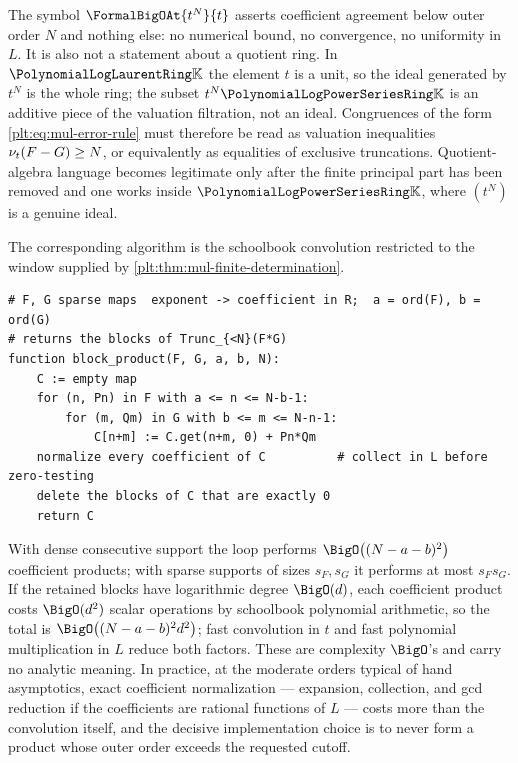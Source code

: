 \begin{remark}
\label{plt:rmk:mul-not-an-ideal}
The symbol $\FormalBigOAt{t^{N}}{t}$ asserts coefficient agreement below
outer order $N$ and nothing else: no numerical bound, no convergence, no
uniformity in $L$.  It is also not a statement about a quotient ring.  In
$\PLlau$ the element $t$ is a unit, so the ideal generated by $t^N$ is the
whole ring; the subset $t^N\PLpow$ is an additive piece of the
valuation filtration, not an ideal.  Congruences of the form
\eqref{plt:eq:mul-error-rule} must therefore be read as valuation
inequalities $\nu_{t}(F-G)\ge N$, or equivalently as equalities of exclusive
truncations.  Quotient-algebra language becomes legitimate only after the
finite principal part has been removed and one works inside $\PLpow$, where
$(t^N)$ is a genuine ideal.
\end{remark}

The corresponding algorithm is the schoolbook convolution restricted to the
window supplied by \cref{plt:thm:mul-finite-determination}.

\begin{lstlisting}[style=pseudo,caption={Truncated block product},label={plt:alg:mul-truncated}]
# F, G sparse maps  exponent -> coefficient in R;  a = ord(F), b = ord(G)
# returns the blocks of Trunc_{<N}(F*G)
function block_product(F, G, a, b, N):
    C := empty map
    for (n, Pn) in F with a <= n <= N-b-1:
        for (m, Qm) in G with b <= m <= N-n-1:
            C[n+m] := C.get(n+m, 0) + Pn*Qm
    normalize every coefficient of C          # collect in L before zero-testing
    delete the blocks of C that are exactly 0
    return C
\end{lstlisting}

\begin{remark}
\label{plt:rmk:mul-cost}
With dense consecutive support the loop performs
$\BigO\bigl((N-a-b)^2\bigr)$ coefficient products; with sparse supports of
sizes $s_F,s_G$ it performs at most $s_Fs_G$.  If the retained blocks have
logarithmic degree $\BigO(d)$, each coefficient product costs
$\BigO(d^2)$ scalar operations by schoolbook polynomial arithmetic, so the
total is $\BigO\bigl((N-a-b)^2d^2\bigr)$; fast convolution in $t$ and fast
polynomial multiplication in $L$ reduce both factors.  These are complexity
$\BigO$'s and carry no analytic meaning.  In practice, at the moderate orders
typical of hand asymptotics, exact coefficient normalization --- expansion,
collection, and gcd reduction if the coefficients are rational functions of
$L$ --- costs more than the convolution itself, and the decisive
implementation choice is to never form a product whose outer order exceeds
the requested cutoff.
\end{remark}

